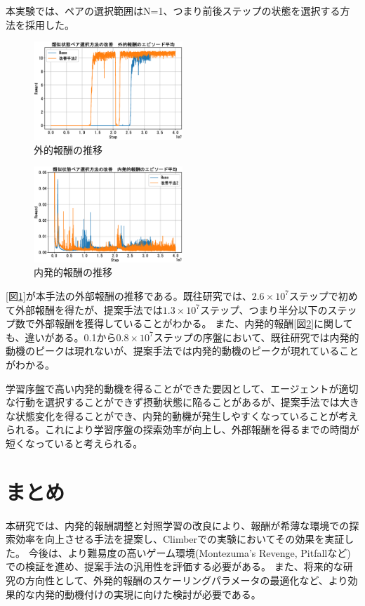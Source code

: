 本実験では、ペアの選択範囲はN=1、つまり前後ステップの状態を選択する方法を採用した。
\begin{figure}[h]
   \centering
   \includegraphics[width=0.5\textwidth]{Method2_Ext.eps}
   \caption{外的報酬の推移}\label{fig5:figure5}
\end{figure}
\begin{figure}[h]
   \centering
   \includegraphics[width=0.5\textwidth]{Method2_Intr.eps}
   \caption{内発的報酬の推移}\label{fig6:figure6}
\end{figure}
[図\ref{fig5:figure5}]が本手法の外部報酬の推移である。既往研究では、$2.6\times10^7$ステップで初めて外部報酬を得たが、提案手法では$1.3\times10^7$ステップ、つまり半分以下のステップ数で外部報酬を獲得していることがわかる。
また、内発的報酬[図\ref{fig6:figure6}]に関しても、違いがある。0.1から$0.8\times10^7$ステップの序盤において、既往研究では内発的動機のピークは現れないが、提案手法では内発的動機のピークが現れていることがわかる。

学習序盤で高い内発的動機を得ることができた要因として、エージェントが適切な行動を選択することができず摂動状態に陥ることがあるが、提案手法では大きな状態変化を得ることができ、内発的動機が発生しやすくなっていることが考えられる。これにより学習序盤の探索効率が向上し、外部報酬を得るまでの時間が短くなっていると考えられる。

\section{まとめ}
本研究では、内発的報酬調整と対照学習の改良により、報酬が希薄な環境での探索効率を向上させる手法を提案し、Climberでの実験においてその効果を実証した。
今後は、より難易度の高いゲーム環境(Montezuma's Revenge, Pitfallなど)での検証を進め、提案手法の汎用性を評価する必要がある。
また、将来的な研究の方向性として、外発的報酬のスケーリングパラメータの最適化など、より効果的な内発的動機付けの実現に向けた検討が必要である。

